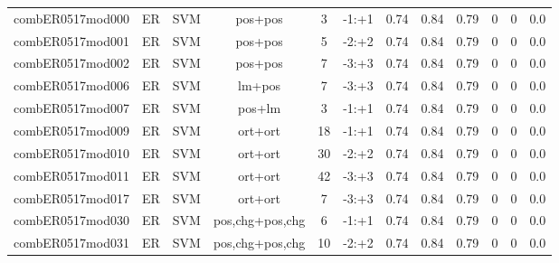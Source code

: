 \documentclass[a4paper]{article}
\begin{document}
\begin{landscape}
\begin{center}
\begin{tabular}{ |c|c|c|c|c|c|c|c|c|c|c|c|}
 
 	
 	\small{ combER0517mod000 } & ER & SVM & pos+pos  &  3 &  -1:+1  &  0.74 & 0.84 & 0.79  &  0 & 0 & 0.0 \\
 	

 
 	
 	\small{ combER0517mod001 } & ER & SVM & pos+pos  &  5 &  -2:+2  &  0.74 & 0.84 & 0.79  &  0 & 0 & 0.0 \\
 	

 
 	
 	\small{ combER0517mod002 } & ER & SVM & pos+pos  &  7 &  -3:+3  &  0.74 & 0.84 & 0.79  &  0 & 0 & 0.0 \\
 	

 
 	
 	\small{ combER0517mod006 } & ER & SVM & lm+pos  &  7 &  -3:+3  &  0.74 & 0.84 & 0.79  &  0 & 0 & 0.0 \\
 	

 
 	
 	\small{ combER0517mod007 } & ER & SVM & pos+lm  &  3 &  -1:+1  &  0.74 & 0.84 & 0.79  &  0 & 0 & 0.0 \\
 	

 
 	
 	\small{ combER0517mod009 } & ER & SVM & ort+ort  &  18 &  -1:+1  &  0.74 & 0.84 & 0.79  &  0 & 0 & 0.0 \\
 	

 
 	
 	\small{ combER0517mod010 } & ER & SVM & ort+ort  &  30 &  -2:+2  &  0.74 & 0.84 & 0.79  &  0 & 0 & 0.0 \\
 	

 
 	
 	\small{ combER0517mod011 } & ER & SVM & ort+ort  &  42 &  -3:+3  &  0.74 & 0.84 & 0.79  &  0 & 0 & 0.0 \\
 	

 
 	
 	\small{ combER0517mod017 } & ER & SVM & ort+ort  &  7 &  -3:+3  &  0.74 & 0.84 & 0.79  &  0 & 0 & 0.0 \\
 	

 
 	
 	\small{ combER0517mod030 } & ER & SVM & pos,chg+pos,chg  &  6 &  -1:+1  &  0.74 & 0.84 & 0.79  &  0 & 0 & 0.0 \\
 	

 
 	
 	\small{ combER0517mod031 } & ER & SVM & pos,chg+pos,chg  &  10 &  -2:+2  &  0.74 & 0.84 & 0.79  &  0 & 0 & 0.0 \\
 	


\end{tabular}
\end{center}
\end{landscape}
\end{document}
